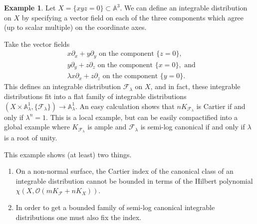 \documentclass[12pt, a4paper]{amsart}
\theoremstyle{definition}
\newtheorem{ej}[theorem]{Example}
\theoremstyle{named}
\begin{document}
\begin{ej}
\label{example_index}
Let $X = \{xyz = 0\} \subset \mathbb A^3$.
We can define an integrable distribution on $X$
by specifying a vector field on each of the three components which agree (up to scalar multiple) on the coordinate axes. 

Take the vector fields
\begin{align*} 
&x\partial_x+y\partial_y \text{ on the component } \{z = 0\}, \\
&y\partial_y+z\partial_z \text{ on the component } \{x = 0\},  \text{ and } \\
&\lambda x\partial_x+z\partial_z
\text{ on the component } \{y = 0\}.
\end{align*}
This defines an integrable distribution $\mathcal F_\lambda$ on $X$, and in fact, these integrable distributions fit into a flat family of integrable distributions $(X \times \mathbb A_\lambda^1, \{\mathcal F_\lambda\}) \to \mathbb A_\lambda^1$.
An easy calculation shows that $nK_{\mathcal F_\lambda}$ is Cartier if and only if $\lambda^n = 1$.  This is a local example, but can be easily compactified into a global example where $K_{\mathcal F_\lambda}$
is ample and $\mathcal F_\lambda$ is semi-log canonical if and only if $\lambda$ is a root of unity. 

This example shows (at least) two things.
\begin{enumerate}
    \item On a non-normal surface, the Cartier index of the canonical class of an integrable distribution cannot be bounded in terms of the Hilbert polynomial 
$\chi(X, \mathcal O(mK_{\mathcal F}+nK_X))$.

\item In order to get a bounded family of semi-log canonical integrable distributions one must also fix the index.
\end{enumerate}
\end{ej}
\end{document}
